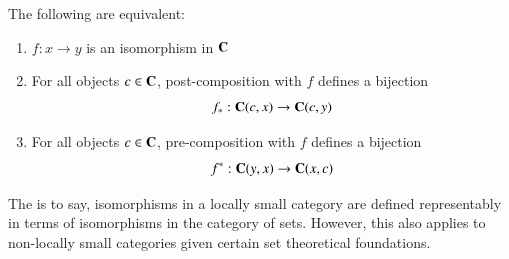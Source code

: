 \documentclass[12pt, a4paper, oneside, openright, titlepage]{book}
\begin{document}
\begin{lem}
    The following are equivalent: \begin{enumerate}
        \item $f:x\rightarrow y$ is an isomorphism in $\normalfont\textbf{C}$
        \item For all objects $c \in \normalfont\textbf{C}$, post-composition with $f$ defines a bijection \begin{equation*}
                f_*:\normalfont\textbf{C}(c,x)\rightarrow \normalfont\textbf{C}(c,y)
        \end{equation*}
    \item For all objects $c \in \normalfont\textbf{C}$, pre-composition with $f$ defines a bijection \begin{equation*}
            f^*:\normalfont\textbf{C}(y,x)\rightarrow \normalfont\textbf{C}(x,c)
    \end{equation*}
    \end{enumerate}
    The is to say, isomorphisms in a locally small category are defined representably in terms of isomorphisms in the category of sets. However, this also applies to non-locally small categories given certain set theoretical foundations.
\end{lem}
\end{document}
